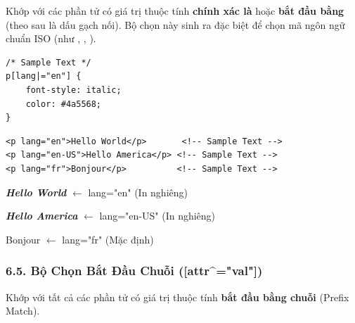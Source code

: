 \begin{conceptBox}
Khớp với các phần tử có giá trị thuộc tính \textbf{chính xác là } hoặc \textbf{bắt đầu bằng } (theo sau là dấu gạch nối). Bộ chọn này sinh ra đặc biệt để chọn mã ngôn ngữ chuẩn ISO (như , , ).
\end{conceptBox}

\begin{codeWindow}
\begin{lstlisting}[language=CSS3]
/* Sample Text */
p[lang|="en"] {
    font-style: italic;
    color: #4a5568;
}
\end{lstlisting}

\begin{lstlisting}[language=HTML5]
<p lang="en">Hello World</p>       <!-- Sample Text -->
<p lang="en-US">Hello America</p> <!-- Sample Text -->
<p lang="fr">Bonjour</p>          <!-- Sample Text -->
\end{lstlisting}
\end{codeWindow}

\begin{browserWindow}
\sffamily\small
\textit{\textcolor{gray!80}{\textbf{Hello World}}} \textcolor{gray!60}{\scriptsize $\leftarrow$ lang="en" (In nghiêng)} \par\vspace{2pt}
\textit{\textcolor{gray!80}{\textbf{Hello America}}} \textcolor{gray!60}{\scriptsize $\leftarrow$ lang="en-US" (In nghiêng)} \par\vspace{2pt}
Bonjour \textcolor{gray!60}{\scriptsize $\leftarrow$ lang="fr" (Mặc định)}
\end{browserWindow}

\subsubsection{6.5. Bộ Chọn Bắt Đầu Chuỗi ([attr\textasciicircum{}="val"])}

\begin{conceptBox}
Khớp với tất cả các phần tử có giá trị thuộc tính \textbf{bắt đầu bằng chuỗi } (Prefix Match).
\end{conceptBox}

